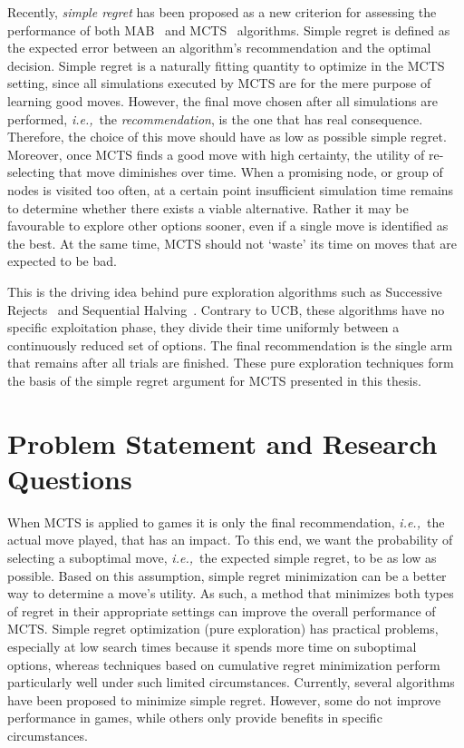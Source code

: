 \documentclass{kecsmstr}
\newcommand{\ie}{{\it i.e.,}~}
\begin{document}
Recently, \emph{simple regret} has been proposed as a new criterion for assessing the performance of both MAB~ and MCTS~ algorithms. Simple regret is defined as the expected error between an algorithm's recommendation and the optimal decision. Simple regret is a naturally fitting quantity to optimize in the MCTS setting, since all simulations executed by MCTS are for the mere purpose of learning good moves. However, the final move chosen after all simulations are performed, \ie the \emph{recommendation}, is the one that has real consequence. Therefore, the choice of this move should have as low as possible simple regret. Moreover, once MCTS finds a good move with high certainty, the utility of re-selecting that move diminishes over time. When a promising node, or group of nodes is visited too often, at a certain point insufficient simulation time remains to determine whether there exists a viable alternative. Rather it may be favourable to explore other options sooner, even if a single move is identified as the best. At the same time, MCTS should not `waste' its time on moves that are expected to be bad.

This is the driving idea behind pure exploration algorithms such as Successive Rejects~ and Sequential Halving~. Contrary to UCB, these algorithms have no specific exploitation phase, they divide their time uniformly between a continuously reduced set of options. The final recommendation is the single arm that remains after all trials are finished. These pure exploration techniques form the basis of the simple regret argument for MCTS presented in this thesis.
\newpage
\section{Problem Statement and Research Questions}
When MCTS is applied to games it is only the final recommendation, \ie the actual move played, that has an impact. To this end, we want the probability of selecting a suboptimal move, \ie the expected simple regret, to be as low as possible. Based on this assumption, simple regret minimization can be a better way to determine a move's utility. As such, a method that minimizes both types of regret in their appropriate settings can improve the overall performance of MCTS. Simple regret optimization (pure exploration) has practical problems, especially at low search times because it spends more time on suboptimal options, whereas techniques based on cumulative regret minimization perform particularly well under such limited circumstances. Currently, several algorithms have been proposed to minimize simple regret. However, some do not improve performance in games, while others only provide benefits in specific circumstances.
\end{document}
